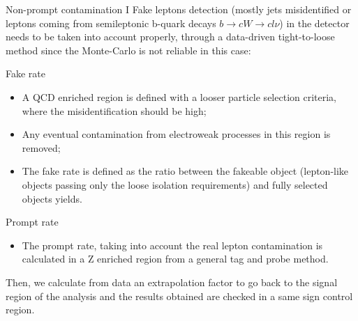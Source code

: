 \documentclass[8pt]{beamer}
\begin{document}
\begin{frame}{Non-prompt contamination I}
\justifying
Fake leptons detection (mostly jets misidentified or leptons coming from semileptonic b-quark decays $b \rightarrow cW \rightarrow c l \nu$) in the detector needs to be taken into account properly, through a \alert{data-driven tight-to-loose method} since the Monte-Carlo is not reliable in this case: \vfill

\begin{block}{\centering Fake rate}\end{block} \vspace{-5pt}
\begin{itemize}
\justifying
\item A QCD enriched region is defined with a looser particle selection criteria, where the misidentification should be high;
\item Any eventual contamination from electroweak processes in this region is removed;
\item The \alert{fake rate} is defined as the ratio between the fakeable object (lepton-like objects passing only the loose isolation requirements) and fully selected objects yields.
\end{itemize} \vfill

\begin{block}{\centering Prompt rate}\end{block} \vspace{-5pt}
\begin{itemize}
\justifying
\item The \alert{prompt rate}, taking into account the real lepton contamination is calculated in a Z enriched region from a general tag and probe method.
\end{itemize} \vfill

Then, we calculate from data an extrapolation factor to go back to the signal region of the analysis and the results obtained are checked in a \alert{same sign control region}. \vfill
\end{frame}
\end{document}
